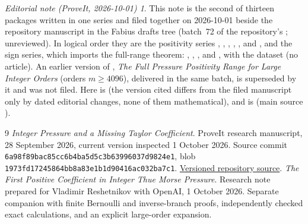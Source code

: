 \documentclass[11pt,a4paper]{article}
\theoremstyle{remark}\newtheorem*{ednote}{Editorial note (ProveIt, 2026-10-01)}
\begin{document}
\begin{ednote}
This note is the second of thirteen packages written in one series and filed together on 2026-10-01 beside the repository manuscript  in the Fabius drafts tree (batch~72 of the repository's ; unreviewed). In logical order they are the positivity series , , , , ,  and , and the sign series, which imports the full-range theorem: , , ,  and , with the dataset  (no article). An earlier version of , \emph{The Full Pressure Positivity Range for Large Integer Orders} (orders $m\ge4096$), delivered in the same batch, is superseded by it and was not filed.
Here \cite{integer} is  (the version cited differs from the filed manuscript only by dated editorial changes, none of them mathematical), and \cite{first} is
 (main source ).
\end{ednote}
\begin{thebibliography}{9}\small
{}\emph{Integer Pressure and a Missing Taylor Coefficient}. ProveIt research manuscript, 28 September 2026, current version inspected 1 October 2026. Source commit \nolinkurl{6a98f89bac85cc6b4ba5d5c3b63996037d9824e1}, blob \nolinkurl{1973fd17245864bb8a83e1b1d90416ac032ba7c1}.\newline
\href{https://github.com/VladimirReshetnikov/ProveIt/blob/6a98f89bac85cc6b4ba5d5c3b63996037d9824e1/Analysis/FabiusFunction/docs/semi-formalized-research-frontiers/drafts/thue-morse/Thue_Morse_Integer_Pressure/article.tex}{Versioned repository source}.
\emph{The First Positive Coefficient in Integer Thue Morse Pressure}. Research note prepared for Vladimir Reshetnikov with OpenAI, 1 October 2026. Separate companion with finite Bernoulli and inverse-branch proofs, independently checked exact calculations, and an explicit large-order expansion.
\end{thebibliography}
\end{document}
